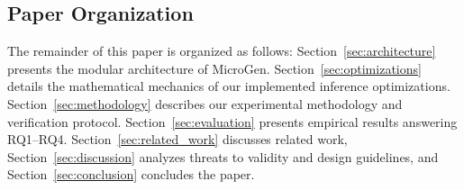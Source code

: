 \subsection{Paper Organization}
\label{sec:organization}

The remainder of this paper is organized as follows: Section~\ref{sec:architecture} presents the modular architecture of \textsf{MicroGen}. Section~\ref{sec:optimizations} details the mathematical mechanics of our implemented inference optimizations. Section~\ref{sec:methodology} describes our experimental methodology and verification protocol. Section~\ref{sec:evaluation} presents empirical results answering RQ1–RQ4. Section~\ref{sec:related_work} discusses related work, Section~\ref{sec:discussion} analyzes threats to validity and design guidelines, and Section~\ref{sec:conclusion} concludes the paper.
